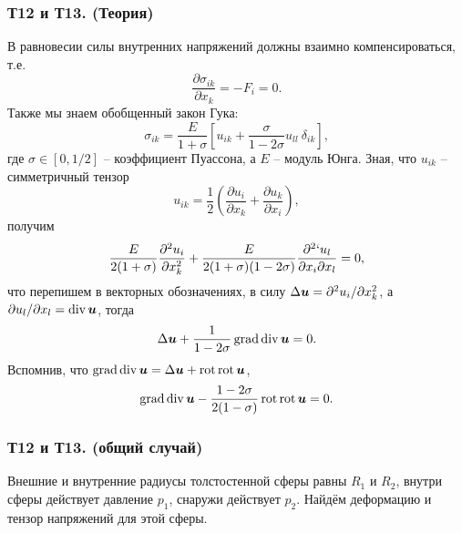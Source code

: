 
\subsubsection*{Т12 и Т13. (Теория)}

В равновесии силы внутренних напряжений должны взаимно компенсироваться, т.е.
\begin{equation}
    \frac{\partial \sigma_{ik}}{\partial x_k} = -F_i = 0.
\end{equation}
Также мы знаем обобщенный закон Гука:
\begin{equation}
    \sigma_{ik} = \frac{E}{1+\sigma} \left[
        u_{ik} + \frac{\sigma}{1-2\sigma} u_{ll} \ \delta_{ik}
    \right],
\end{equation}
где $\sigma \in [0, 1/2]$ -- коэффициент Пуассона, а $E$ -- модуль Юнга.
Зная, что $u_{ik}$ -- симметричный тензор
$$
    u_{ik} = \frac{1}{2} \left(
        \frac{\partial u_i}{\partial x_k} + \frac{\partial u_k}{\partial x_i} 
    \right),
$$
получим
$$
    \frac{E}{2(1+\sigma)} \frac{\partial^2 u_i}{\partial x_k^2}  +
    \frac{E}{2(1+\sigma)(1-2\sigma)} \frac{\partial^2 `u_l}{\partial x_i \partial x_l} = 0,
$$
что перепишем в векторных обозначениях, в силу $\Delta \mbox{\boldmath $u$} = \partial^2 u_i / \partial x_k^2$, а $\partial u_l / \partial x_l = \mathop{\mathrm{div}}\nolimits \mbox{\boldmath $u$}$, тогда
$$
    \Delta \mbox{\boldmath $u$} + \frac{1}{1-2\sigma} \mathop{\mathrm{grad}}\nolimits \mathop{\mathrm{div}}\nolimits \mbox{\boldmath $u$} = 0.
$$
Вспомнив, что $\mathop{\mathrm{grad}}\nolimits \mathop{\mathrm{div}}\nolimits \mbox{\boldmath $u$} = \Delta \mbox{\boldmath $u$} + \mathop{\mathrm{rot}}\nolimits \mathop{\mathrm{rot}}\nolimits \mbox{\boldmath $u$}$,
\begin{equation}
\label{7_5}
    \mathop{\mathrm{grad}}\nolimits \mathop{\mathrm{div}}\nolimits \mbox{\boldmath $u$} - \frac{1-2\sigma}{2(1-\sigma)} \mathop{\mathrm{rot}}\nolimits \mathop{\mathrm{rot}}\nolimits \mbox{\boldmath $u$} = 0.
\end{equation}


\subsubsection*{Т12 и Т13. (общий случай)}

Внешние и внутренние радиусы толстостенной сферы равны $R_1$ и $R_2$, внутри сферы действует давление $p_1$, снаружи действует $p_2$. Найдём деформацию и тензор напряжений для этой сферы.

